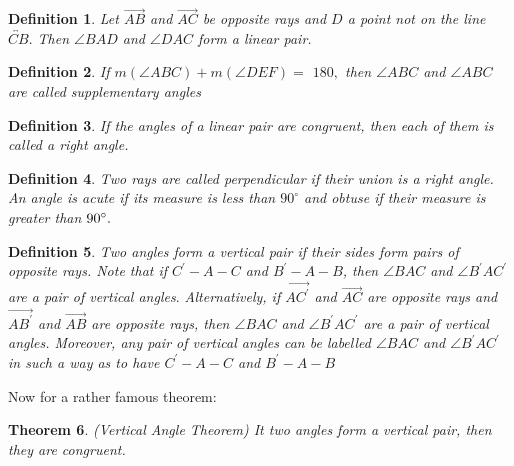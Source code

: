 \documentclass[12pt]{article}
\newtheorem{theorem}{Theorem}
\newtheorem{definition}[theorem]{Definition}
\begin{document}
\begin{definition}
Let $\overrightarrow{AB}$ and $\overrightarrow{AC}$ be opposite rays and $D$
a point not on the line $\overleftrightarrow{CB}.$ Then $\angle BAD$ and $%
\angle DAC$ form a linear pair.\smallskip 
\end{definition}

\begin{definition}
If $m\left( \angle ABC\right) +m\left( \angle DEF\right) =$ $180,$ then $%
\angle ABC$ and $\angle ABC$ are called supplementary angles\smallskip 
\end{definition}

\begin{definition}
If the angles of a linear pair are congruent, then each of them is called a
right angle.\smallskip 
\end{definition}

\begin{definition}
Two rays are called perpendicular if their union is a right angle. An angle
is acute if its measure is less than $90^{\circ }$ and obtuse if their
measure is greater than $90^{\circ }.\smallskip $
\end{definition}

\begin{definition}
Two angles form a vertical pair if their sides form pairs of opposite rays.
Note that if $C^{\prime }-A-C$ and $B^{\prime }-A-B$, then $\angle BAC$ and $%
\angle B^{\prime }AC^{\prime }$ are a pair of vertical angles$.$
Alternatively, if $\overrightarrow{AC^{\prime }}$ and $\overrightarrow{AC}$
are opposite rays and $\overrightarrow{AB^{\prime }}$ and $\overrightarrow{AB%
}$ are opposite rays, then $\angle BAC$ and $\angle B^{\prime }AC^{\prime }$
are a pair of vertical angles. Moreover, any pair of vertical angles can be
labelled $\angle BAC$ and $\angle B^{\prime }AC^{\prime }$ in such a way as
to have $C^{\prime }-A-C$ and $B^{\prime }-A-B$
\end{definition}

Now for a rather famous theorem:\medskip

\begin{theorem}
(Vertical Angle Theorem) It two angles form a vertical pair, then they are
congruent.
\end{theorem}
\end{document}
